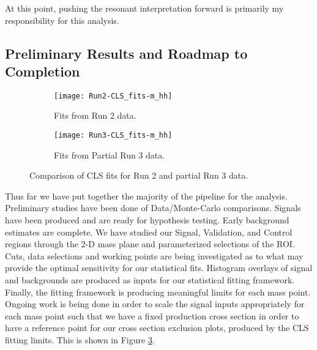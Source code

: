 \documentclass[12pt]{article}
\begin{document}
At this point, pushing the resonant interpretation forward is primarily my
responsibility for this analysis.



\subsection{Preliminary Results and Roadmap to Completion}
\begin{figure}[t]
    \centering
    \begin{subfigure}[t]{.48\textwidth}
        \centering
        \texttt{[image: Run2-CLS\_fits-m\_hh]}
        \caption{Fits from Run 2 data.}
        \label{subfig:cls-run2}
    \end{subfigure}
    \begin{subfigure}[t]{.48\textwidth}
        \centering
        \texttt{[image: Run3-CLS\_fits-m\_hh]}
        \caption{Fits from Partial Run 3 data.}
        \label{subfig:cls-run3}
    \end{subfigure}
\caption{Comparison of CLS fits for Run 2 and partial Run 3 data.}
\label{fig:cls_fit_results}
\end{figure}
Thus far we have put together the majority of the pipeline for the analysis.
Preliminary studies have been done of Data/Monte-Carlo comparisons. Signals have been
produced and are ready for hypothesis testing. Early background estimates are
complete. We have studied our Signal, Validation, and Control regions through
the 2-D mass plane and parameterized selections of the ROI. Cuts, data
selections and working points are being investigated as to what may provide the
optimal sensitivity for our statistical fits. Histogram overlays of signal and
backgrounds are produced as inputs for our statistical fitting framework.
Finally, the fitting framework is producing meaningful limits for each mass
point. Ongoing work is being done in order to scale the signal inputs
appropriately for each mass point such that we have a fixed production cross
section in order to have a reference point for our cross section exclusion
plots, produced by the CLS fitting limits. This is shown in Figure
\ref{fig:cls_fit_results}. 
\end{document}
